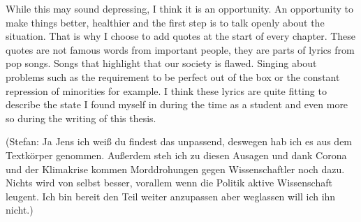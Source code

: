 While this may sound depressing, I think it is an opportunity.
An opportunity to make things better, healthier and the first step is to talk openly about the situation.
That is why I choose to add quotes at the start of every chapter.
These quotes are not famous words from important people, they are parts of lyrics from pop songs.
Songs that highlight that our society is flawed.
Singing about problems such as the requirement to be perfect out of the box or the constant repression of minorities for example.
I think these lyrics are quite fitting to describe the state I found myself in during the time as a student and even more so during the writing of this thesis.

(\textcolor{pyblue}{Stefan: Ja Jens ich weiß du findest das unpassend, deswegen hab ich es aus dem Textkörper genommen. Außerdem steh ich zu diesen Ausagen und dank Corona und der Klimakrise kommen Morddrohungen gegen Wissenschaftler noch dazu. Nichts wird von selbst besser, vorallem wenn die Politik aktive Wissenschaft leugent. Ich bin bereit den Teil weiter anzupassen aber weglassen will ich ihn nicht.})